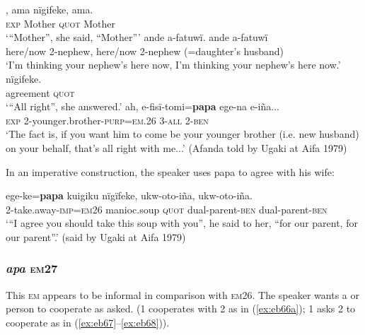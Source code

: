 \documentclass[output=paper]{langsci/langscibook}
\begin{document}
\begin{exe}
\ex \label{ex:eb64}
	\begin{xlist}
	\ex \label{ex:eb64a}
	, ama nïgifeke, ama.\\
	\textsc{exp} Mother \textsc{quot} Mother\\
	\trans `“Mother”, she said, “Mother”'
	\ex \label{ex:eb64b}
	\gll ande a-fatuwï. ande a-fatuwï\\
	here/now 2-nephew, here/now 2-nephew (=daughter’s husband)\\
	\trans `I’m thinking your nephew’s here now, I’m thinking your nephew’s here now.'
	\ex \label{ex:eb64c}
	 nïgifeke.\\
	agreement \textsc{quot}\\
	\trans `“All right”, she answered.'
	\ex \label{ex:eb64d}
	\gll ah, e-fisï-tomi=\textbf{papa} ege-na e-iña...\\
	\textsc{exp} 2-younger.brother-\textsc{purp=em.26} 3-\textsc{all} 2-\textsc{ben}\\
	\trans ‘The fact is,  if you want him to come  be your  younger brother (i.e. new husband) on your behalf,  that’s all right with me...' (Afanda told by Ugaki at Aifa 1979)
\end{xlist}
\end{exe}

In an imperative construction, the  speaker uses papa to agree with his wife:

\begin{exe}
	\ex \label{ex:eb65}
	\gll ege-ke=\textbf{papa} kuigiku nïgïfeke, ukw-oto-iña, ukw-oto-iña.\\
	2-take.away-\textsc{imp}=\textsc{em26} manioc.soup \textsc{quot} dual-parent-\textsc{ben} dual-parent-\textsc{ben}\\
	\trans `“I agree you should take this soup with you”, he said to her, “for our parent, for our parent”.' (said by Ugaki at Aifa 1979)
\end{exe}

\subsubsection{\textit{apa} \textsc{em}27} 
This \textsc{em} appears to be informal in comparison with \textsc{em}26.  The speaker wants a  or  person to cooperate as asked. (1 cooperates with 2 as in (\ref{ex:eb66a}); 1 asks 2 to cooperate as in (\ref{ex:eb67}--\ref{ex:eb68})).  
\end{document}
